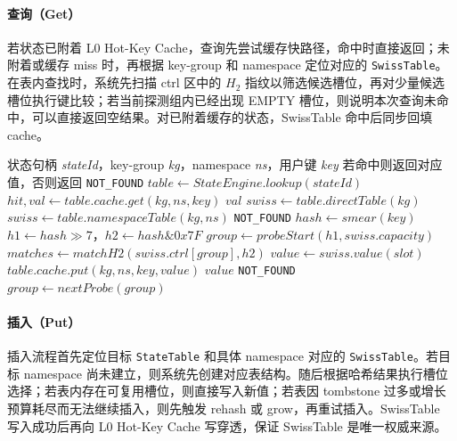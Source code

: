 \documentclass[a4paper,11pt]{article}
\begin{document}
\paragraph{查询（Get）}

若状态已附着 L0 Hot-Key Cache，查询先尝试缓存快路径，命中时直接返回；未附着或缓存 miss 时，再根据 key-group 和 namespace 定位对应的 \texttt{SwissTable}。在表内查找时，系统先扫描 ctrl 区中的 \(H_2\) 指纹以筛选候选槽位，再对少量候选槽位执行键比较；若当前探测组内已经出现 EMPTY 槽位，则说明本次查询未命中，可以直接返回空结果。对已附着缓存的状态，SwissTable 命中后同步回填 cache。

\begin{algorithm}[!htbp]
\caption{状态查询算法（含 L0 Hot-Key Cache 快路径）}
\footnotesize
\begin{algorithmic}[1]
\Require 状态句柄 \textit{stateId}，key-group \textit{kg}，namespace \textit{ns}，用户键 \textit{key}
\Ensure 若命中则返回对应值，否则返回 \texttt{NOT\_FOUND}
\State $table \gets StateEngine.lookup(stateId)$
  
  \State $hit, val \gets table.cache.get(kg, ns, key)$
    \State \Return $val$
  \EndIf
\EndIf
{}
  \State $swiss \gets table.directTable(kg)$
\Else
  \State $swiss \gets table.namespaceTable(kg, ns)$
    \State \Return \texttt{NOT\_FOUND}
  \EndIf
\EndIf
\State $hash \gets smear(key)$
\State $h1 \gets hash \gg 7$，$h2 \gets hash \mathbin{\&} 0x7F$
\State $group \gets probeStart(h1, swiss.capacity)$
  \State $matches \gets matchH2(swiss.ctrl[group], h2)$
      \State $value \gets swiss.value(slot)$
        \State $table.cache.put(kg, ns, key, value)$ 
      \EndIf
      \State \Return $value$
    \EndIf
  \EndFor
    \State \Return \texttt{NOT\_FOUND}
  \EndIf
  \State $group \gets nextProbe(group)$
\EndWhile
\end{algorithmic}
\end{algorithm}

\paragraph{插入（Put）}

插入流程首先定位目标 \texttt{StateTable} 和具体 namespace 对应的 \texttt{SwissTable}。若目标 namespace 尚未建立，则系统先创建对应表结构。随后根据哈希结果执行槽位选择；若表内存在可复用槽位，则直接写入新值；若表因 tombstone 过多或增长预算耗尽而无法继续插入，则先触发 rehash 或 grow，再重试插入。SwissTable 写入成功后再向 L0 Hot-Key Cache 写穿透，保证 SwissTable 是唯一权威来源。
\end{document}
